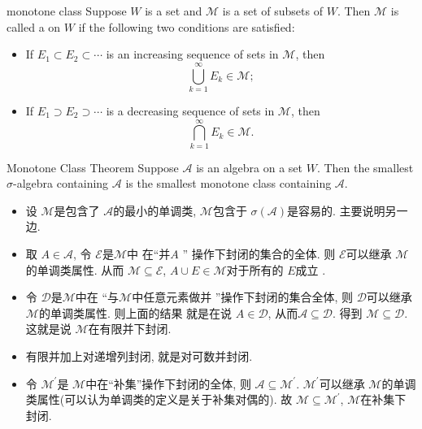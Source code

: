 \documentclass[../main.tex]{subfiles}
\begin{document}
\begin{definition}{monotone class}{}
Suppose $W$ is a set and $\mathcal{M}$ is a set of subsets of $W$. Then $\mathcal{M}$ is called a  on $W$ if the following two conditions are satisfied:

\begin{itemize}
  \item If $E_1 \subset E_2 \subset \cdots$ is an increasing sequence of sets in $\mathcal{M}$, then
  \[
    \bigcup_{k=1}^{\infty} E_k \in \mathcal{M};
  \]
  \item If $E_1 \supset E_2 \supset \cdots$ is a decreasing sequence of sets in $\mathcal{M}$, then
  \[
    \bigcap_{k=1}^{\infty} E_k \in \mathcal{M}.
  \]
\end{itemize}
\end{definition}

\begin{theorem}{Monotone Class Theorem}{}
Suppose \(\mathcal{A}\) is an algebra on a set \(W\). Then the smallest \(\sigma\)-algebra containing \(\mathcal{A}\) is the smallest monotone class containing \(\mathcal{A}\).
\end{theorem}

\begin{proofsketch}
  \begin{itemize}
    \item 设 \(  \mathcal{M}  \)是包含了 \(  \mathcal{A}  \)的最小的单调类, \(  \mathcal{M}  \)包含于 \(   \sigma \left( \mathcal{A} \right)   \)是容易的. 主要说明另一边.
    \item 取 \(  A\in \mathcal{A}  \),  令 \(  \mathcal{E}  \)是\(  \mathcal{M}  \)中 在``并\(  A  \) '' 操作下封闭的集合的全体. 则 \(  \mathcal{E}  \)可以继承 \(  \mathcal{M}  \)的单调类属性. 从而 \(  \mathcal{M}\subseteq \mathcal{E}  \), \(  A\cup E\in \mathcal{M}  \)对于所有的 \(  E  \)成立 .  
    \item 令 \(  \mathcal{D}  \)是\(  \mathcal{M}  \)中在 ``与\(  \mathcal{M}  \)中任意元素做并 ''操作下封闭的集合全体, 则 \(  \mathcal{D}  \)可以继承 \(  \mathcal{M}  \)的单调类属性.   则上面的结果 就是在说 \(  A\in \mathcal{D}  \), 从而\(  \mathcal{A}\subseteq \mathcal{D}  \).  得到 \(  \mathcal{M}\subseteq \mathcal{D}  \).  这就是说 \(  \mathcal{M}  \)在有限并下封闭. 
    \item 有限并加上对递增列封闭, 就是对可数并封闭.
    \item 令 \(  \mathcal{M}^{\prime}   \)是 \(  \mathcal{M}  \)中在``补集''操作下封闭的全体, 则 \(  \mathcal{A}\subseteq \mathcal{M}^{\prime}   \). \(  \mathcal{M}^{\prime}   \)可以继承 \(  \mathcal{M}  \)的单调类属性(可以认为单调类的定义是关于补集对偶的). 故 \(  \mathcal{M}\subseteq \mathcal{M}^{\prime}   \), \(  \mathcal{M}  \)在补集下封闭.       
  \end{itemize}
  
\end{proofsketch}
\end{document}

